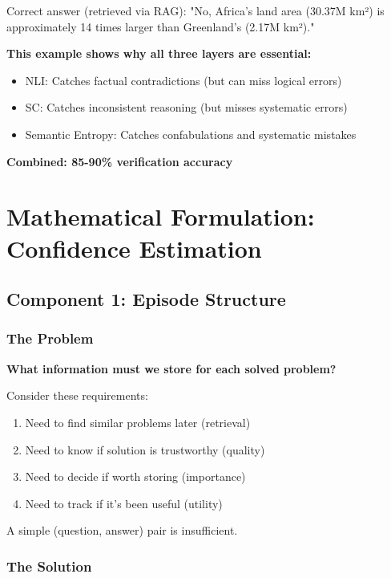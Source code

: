 \documentclass[12pt,a4paper]{article}
\theoremstyle{definition}
\begin{document}
\begin{whybox}
Correct answer (retrieved via RAG): "No, Africa's land area (30.37M km²) is approximately 14 times larger than Greenland's (2.17M km²)."

\textbf{This example shows why all three layers are essential:}
\begin{itemize}
    \item NLI: Catches factual contradictions (but can miss logical errors)
    \item SC: Catches inconsistent reasoning (but misses systematic errors)
    \item Semantic Entropy: Catches confabulations and systematic mistakes
\end{itemize}

\textbf{Combined: 85-90\% verification accuracy}
\end{whybox}
\section{Mathematical Formulation: Confidence Estimation}

\subsection{Component 1: Episode Structure}

\subsubsection{The Problem}

\begin{problembox}
\textbf{What information must we store for each solved problem?}

Consider these requirements:
\begin{enumerate}
    \item Need to find similar problems later (retrieval)
    \item Need to know if solution is trustworthy (quality)
    \item Need to decide if worth storing (importance)
    \item Need to track if it's been useful (utility)
\end{enumerate}

A simple (question, answer) pair is insufficient.
\end{problembox}

\subsubsection{The Solution}
\end{document}
